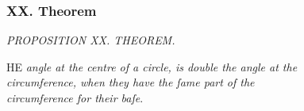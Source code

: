 \documentclass[11pt,preview]{standalone}
\begin{document}
\subsubsection{XX. Theorem}

\begin{minipage}[t]{\textwidth}
    \begin{center}
        \textit{PROPOSITION XX. THEOREM.}\label{book3pr20} \\
    \end{center}

    \hfill

    \begin{center}
        \raggedright \lettrine[lines=3, loversize=1, nindent=0pt]{}{}HE \textit{angle at the centre of a circle, is double the angle at the\\ circumference, when they have the ſame part of the\\ circumference for their baſe}.
    \end{center}
\end{minipage}

\hfill
\end{document}
